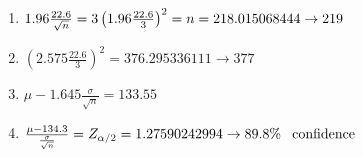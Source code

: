 \documentclass[11pt]{article}
\begin{document}
\begin{preview}
\begin{enumerate}
\begin{enumerate}
        \item $1.96\frac{22.6}{\sqrt{n}}=3 \\
        \left(1.96\frac{22.6}{3}\right)^{2} = n = 218.015068444 \rightarrow 219$

        \item$ \left(2.575\frac{22.6}{3}\right)^{2} = 376.295336111 \rightarrow 377$

        \item $\mu-1.645\frac{\sigma}{\sqrt{n}} = 133.55$
        \item $\frac{\mu-134.3}{\frac{\sigma}{\sqrt{n}}} = Z_{\alpha/2} = 1.27590242994 \rightarrow 89.8\% \hspace*{8pt} \mathrm{confidence}$
\end{enumerate}

\end{enumerate}
\end{preview}
\end{document}
